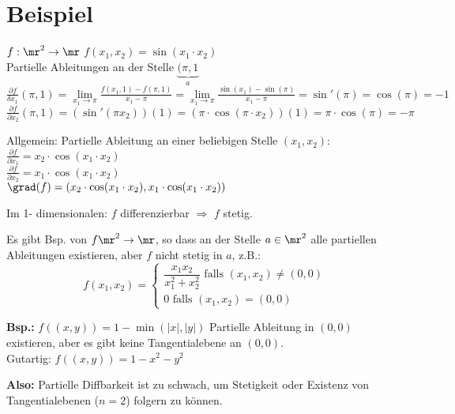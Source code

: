 \section{Beispiel}
	$ f:\mr^2\rightarrow\mr $ $ f(x_1,x_2)=\sin(x_1\cdot x_2) $\\
	Partielle Ableitungen an der Stelle $ \underbrace{(\pi, 1}_{a} $\\
	$ \frac{\partial f}{\delta x_1}(\pi, 1)=\lim\limits_{x_1\rightarrow\pi}\frac{f(x_1,1)-f(\pi, 1)}{x_1-\pi}=\lim\limits_{x_1\rightarrow\pi}\frac{\sin(x_1)-\sin(\pi)}{x_1-\pi}=\sin'(\pi)=\cos(\pi)=-1 $\\
	$ \frac{\partial f}{\partial x_2}(\pi, 1)=(\sin'(\pi x_2))(1)=(\pi\cdot\cos(\pi\cdot x_2))(1)=\pi\cdot\cos(\pi)=-\pi $
	
	Allgemein: Partielle Ableitung an einer beliebigen Stelle $ (x_1,x_2) $:\\
	$ \frac{\partial f}{\partial x_1}=x_2\cdot\cos(x_1\cdot x_2) $\\
	$ \frac{\partial f}{\partial x_2}=x_1\cdot\cos(x_1\cdot x_2) $\\
	$ \grad(f)=(x_2\cdot\cos(x_1\cdot x_2), x_1\cdot\cos(x_1\cdot x_2)) $
	
	Im 1- dimensionalen: $ f $ differenzierbar $ \Rightarrow $ $ f $ stetig.
	
	Es gibt Bsp. von $ f\mr^2\rightarrow\mr $, so dass an der Stelle $ a\in\mr^2 $ alle partiellen Ableitungen existieren, aber $ f $ nicht stetig in $ a $, z.B.:
	\[f(x_1,x_2)=\begin{cases}\dfrac{x_1x_2}{x_1^2+x_2^2}\mbox{ falls } (x_1,x_2)\neq(0,0)\\
	0\mbox{ falls }(x_1,x_2)=(0,0) \end{cases}\]
	
	\textbf{Bsp.:} $ f((x,y))=1-\min(|x|,|y|) $ Partielle Ableitung in $ (0,0) $ existieren, aber es gibt keine Tangentialebene an $(0,0)$.\\
	Gutartig: $ f((x,y))=1-x^2-y^2 $
	
	\textbf{Also:} Partielle Diffbarkeit ist zu schwach, um Stetigkeit oder Existenz von Tangentialebenen ($ n=2 $) folgern zu können.
	
